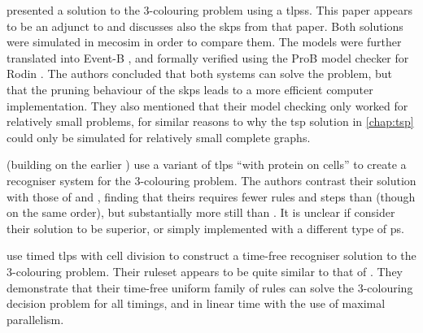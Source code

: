
\citeauthor{Turcanu2012} \cite{Turcanu2012} presented a solution to the 3-colouring problem using a \glspl{tlps}. This paper appears to be an adjunct to \cite{Gheorghe2013} and discusses also the \gls{skps} from that paper.  Both solutions were simulated in \gls{mecosim} in order to compare them.  The models were further translated into Event-B \cite{Abrial2010}, and formally verified using the ProB model checker \cite{Leuschel2008} for Rodin \cite{Abrial2010a}.  The authors concluded that both systems can solve the problem, but that the pruning behaviour of the \gls{skps} leads to a more efficient computer implementation.  They also mentioned that their model checking only worked for relatively small problems, for similar reasons to why the \gls{tsp} solution in \cref{chap:tsp} could only be simulated for relatively small complete graphs.


\citeauthor{Christinal2018} \cite{Christinal2018} (building on the earlier \cite{Mathu2015}) use a variant of \gls{tlps} \enquote{with protein on cells} to create a recogniser system for the 3-colouring problem.  The authors contrast their solution with those of \cite{Diaz-Pernil2008} and \cite{Gheorghe2013}, finding that theirs requires fewer rules and steps than \cite{Diaz-Pernil2008} (though on the same order), but substantially more still than \cite{Gheorghe2013}.  It is unclear if \citeauthor{Christinal2018} consider their solution to be superior, or simply implemented with a different type of \gls{ps}.


\citeauthor{Niu2016} \cite{Niu2016} use timed \gls{tlps} with cell division to construct a time-free recogniser solution to the 3-colouring problem. Their \gls{ruleset} appears to be quite similar to that of \cite{Turcanu2012}.  They demonstrate that their time-free uniform family of rules can solve the 3-colouring decision problem for all timings, and in linear time with the use of maximal parallelism.



